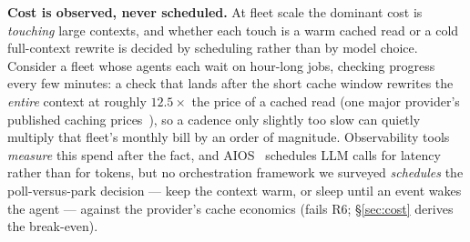 \documentclass[10pt,twocolumn]{article}
\begin{document}
\noindent\textbf{Cost is observed, never scheduled.} At fleet scale the dominant cost
is \emph{touching} large contexts, and whether each touch is a warm cached read or a
cold full-context rewrite is decided by scheduling rather than by model choice.
Consider a fleet whose agents each wait on hour-long jobs, checking progress every few
minutes: a check that lands after the short cache window rewrites the \emph{entire}
context at roughly $12.5\times$ the price of a cached read (one major provider's
published caching prices~\cite{promptcache}), so a cadence only slightly too slow can
quietly multiply that fleet's monthly bill by an order of magnitude. Observability
tools~\cite{langfuse,agentops} \emph{measure} this spend after the fact, and
AIOS~\cite{aios} schedules LLM calls for latency rather than for tokens, but no
orchestration framework we surveyed \emph{schedules} the poll-versus-park decision ---
keep the context warm, or sleep until an event wakes the agent --- against the
provider's cache economics (fails R6; \S\ref{sec:cost} derives the break-even).
\end{document}
